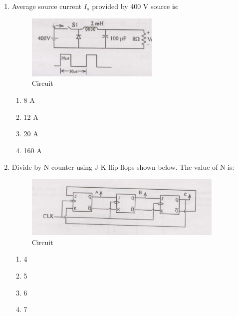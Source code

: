 \documentclass[journal,cmex10]{IEEEtran}
\theoremstyle{remark}
\numberwithin{equation}{enumi}
\numberwithin{figure}{enumi}
\begin{document}
\begin{enumerate}[label=\arabic*)]
    \item Average source current $I_s$ provided by 400 V source is:
    \begin{figure}[htbp]
  \centering
  \includegraphics[width=0.6\textwidth]{figs/C/fig13.png}
  \caption{Circuit}
  \label{C/fig13.png}
\end{figure}
    \bigskip
    \hfill {}
    \begin{enumerate}[label=\alph*)]
        \item 8 A
        \item 12 A
        \item 20 A
        \item 160 A
    \end{enumerate}
    \bigskip

    \item Divide by N counter using J-K flip-flops shown below. The value of N is:
    \begin{figure}[htbp]
  \centering
  \includegraphics[width=0.9\textwidth]{figs/C/fig14.png}
  \caption{Circuit}
  \label{C/fig14.png}
\end{figure}
    \bigskip
    \hfill {}
    \begin{enumerate}[label=\alph*)]
        \item 4
        \item 5
        \item 6
        \item 7
    \end{enumerate}
    \newpage


\end{enumerate}
\end{document}
